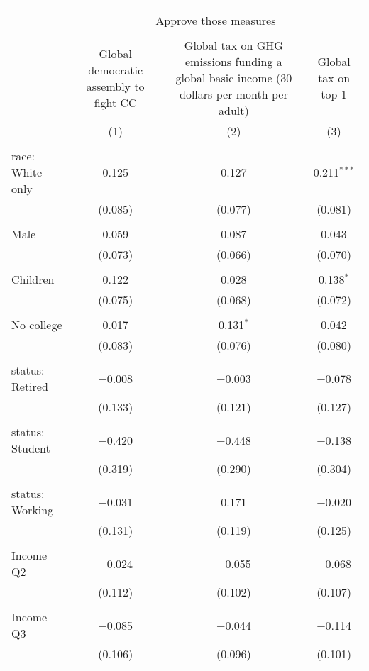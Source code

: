 
\begin{tabular}{@{\extracolsep{5pt}}lccc} 
\\[-1.8ex]\hline 
\hline \\[-1.8ex] 
 & \multicolumn{3}{c}{Approve those measures} \\ 
\cline{2-4} 
\\[-1.8ex] & Global democratic assembly to fight CC & Global tax on GHG emissions funding a global basic income (30 dollars per month per adult) & Global tax on top 1%
\\[-1.8ex] & (1) & (2) & (3)\\ 
\hline \\[-1.8ex] 
 race: White only & 0.125 & 0.127 & 0.211$^{***}$ \\ 
  & (0.085) & (0.077) & (0.081) \\ 
  & & & \\ 
 Male & 0.059 & 0.087 & 0.043 \\ 
  & (0.073) & (0.066) & (0.070) \\ 
  & & & \\ 
 Children & 0.122 & 0.028 & 0.138$^{*}$ \\ 
  & (0.075) & (0.068) & (0.072) \\ 
  & & & \\ 
 No college & 0.017 & 0.131$^{*}$ & 0.042 \\ 
  & (0.083) & (0.076) & (0.080) \\ 
  & & & \\ 
 status: Retired & $-$0.008 & $-$0.003 & $-$0.078 \\ 
  & (0.133) & (0.121) & (0.127) \\ 
  & & & \\ 
 status: Student & $-$0.420 & $-$0.448 & $-$0.138 \\ 
  & (0.319) & (0.290) & (0.304) \\ 
  & & & \\ 
 status: Working & $-$0.031 & 0.171 & $-$0.020 \\ 
  & (0.131) & (0.119) & (0.125) \\ 
  & & & \\ 
 Income Q2 & $-$0.024 & $-$0.055 & $-$0.068 \\ 
  & (0.112) & (0.102) & (0.107) \\ 
  & & & \\ 
 Income Q3 & $-$0.085 & $-$0.044 & $-$0.114 \\ 
  & (0.106) & (0.096) & (0.101) \\ 

\end{tabular}
